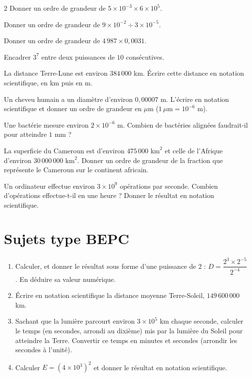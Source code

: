 \begin{multicols}{2}
\exo{} Donner un ordre de grandeur de $5\times10^{-3}\times6\times10^{5}$.

\exo{} Donner un ordre de grandeur de $9\times10^{-2}\div3\times10^{-5}$.

\exo{} Donner un ordre de grandeur de $4\,987\times0{,}0031$.

\exo{} Encadrer $3^{7}$ entre deux puissances de $10$ consécutives.

\exo{} La distance Terre-Lune est environ $384\,000$ km. Écrire cette distance en
notation scientifique, en km puis en m.

\exo{} Un cheveu humain a un diamètre d'environ $0{,}00007$ m. L'écrire en notation
scientifique et donner un ordre de grandeur en $\mu$m ($1\,\mu\text{m}=10^{-6}$ m).

\exo{} Une bactérie mesure environ $2\times10^{-6}$ m. Combien de bactéries alignées
faudrait-il pour atteindre $1$ mm ?

\exo{} La superficie du Cameroun est d'environ $475\,000\text{ km}^{2}$ et celle de
l'Afrique d'environ $30\,000\,000\text{ km}^{2}$. Donner un ordre de grandeur de la fraction
que représente le Cameroun sur le continent africain.

\exo{} Un ordinateur effectue environ $3\times10^{9}$ opérations par seconde. Combien
d'opérations effectue-t-il en une heure ? Donner le résultat en notation scientifique.

\end{multicols}

\section{Sujets type BEPC}

\begin{enumerate}[label=\arabic*)]
\item Calculer, et donner le résultat sous forme d'une puissance de $2$ :
$D=\dfrac{2^{3}\times2^{-5}}{2^{-4}}$. En déduire sa valeur numérique.
\item Écrire en notation scientifique la distance moyenne Terre-Soleil,
$149\,600\,000$ km.
\item Sachant que la lumière parcourt environ $3\times10^{5}$ km chaque seconde, calculer le
temps (en secondes, arrondi au dixième) mis par la lumière du Soleil pour atteindre la Terre.
Convertir ce temps en minutes et secondes (arrondir les secondes à l'unité).
\item Calculer $E=\left(4\times10^{3}\right)^{2}$ et donner le résultat en notation
scientifique.
\end{enumerate}

